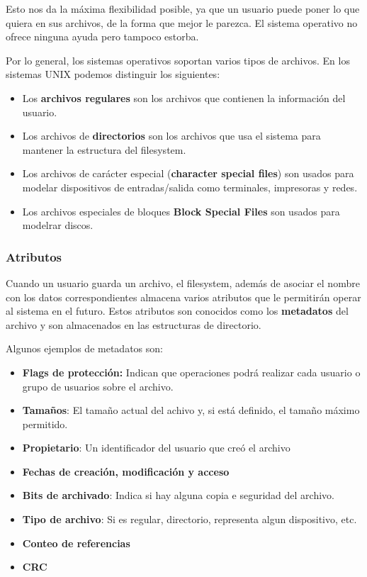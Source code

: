 Esto nos da la máxima flexibilidad posible, ya que un usuario puede poner lo que quiera en sus archivos, de la forma que mejor le parezca. El sistema operativo no ofrece ninguna ayuda pero tampoco estorba.

Por lo general, los sistemas operativos soportan varios tipos de archivos. En los sistemas UNIX podemos distinguir los siguientes: 
\begin{itemize}
	\item Los \textbf{archivos regulares} son los archivos que contienen la información del usuario.
	\item Los archivos de \textbf{directorios} son los archivos que usa el sistema para mantener la estructura del filesystem.
	\item Los archivos de carácter especial (\textbf{character special files}) son usados para modelar dispositivos de entradas/salida como terminales, impresoras y redes.
	\item Los archivos especiales de bloques \textbf{Block Special Files} son usados para modelrar discos.
\end{itemize}

\subsubsection{Atributos}\label{atributos-archivos}
Cuando un usuario guarda un archivo, el filesystem, además de asociar el nombre con los datos correspondientes almacena varios atributos que le permitirán operar al sistema en el futuro. Estos atributos son conocidos como los \textbf{metadatos} del archivo y son almacenados en las estructuras de directorio.

Algunos ejemplos de metadatos son:
\begin{itemize}
	\item \textbf{Flags de protección:} Indican que operaciones podrá realizar cada usuario o grupo de usuarios sobre el archivo.
	\item \textbf{Tamaños}: El tamaño actual del achivo y, si está definido, el tamaño máximo permitido.
	\item \textbf{Propietario}: Un identificador del usuario que creó el archivo
	\item \textbf{Fechas de creación, modificación y acceso}
	\item\textbf{Bits de archivado}: Indica si hay alguna copia e seguridad del archivo.
	\item \textbf{Tipo de archivo}: Si es regular, directorio, representa algun dispositivo, etc.
	\item \textbf{Conteo de referencias}
	\item \textbf{CRC}
\end{itemize}

